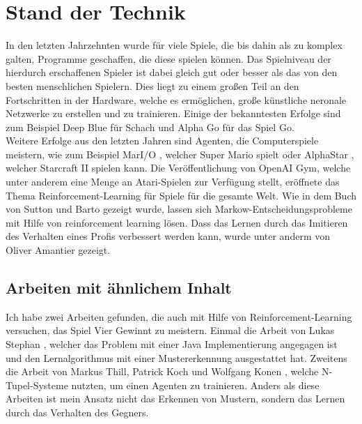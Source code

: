 \chapter{Stand der Technik}
\label{cha:Technik}

In den letzten Jahrzehnten wurde für viele Spiele, die bis dahin als zu komplex galten, Programme geschaffen, die diese spielen können. Das Spielniveau der hierdurch erschaffenen Spieler ist dabei gleich gut oder besser als das von den besten menschlichen Spielern.
Dies liegt zu einem großen Teil an den Fortschritten in der Hardware, welche es ermöglichen, große künstliche neronale Netzwerke zu erstellen und zu trainieren. Einige der bekanntesten Erfolge sind zum Beispiel Deep Blue für Schach und Alpha Go für das Spiel Go.\cite{Sutton2018}\\
Weitere Erfolge aus den letzten Jahren sind Agenten, die Computerspiele meistern, wie zum Beispiel MarI/O \cite{mario}, welcher Super Mario spielt oder AlphaStar \cite{alphastar}, welcher Starcraft II spielen kann.
Die Veröffentlichung von OpenAI Gym\cite{gym}, welche unter anderem eine Menge an Atari-Spielen zur Verfügung stellt, eröffnete das Thema Reinforcement-Learning für Spiele für die gesamte Welt. 
Wie in dem Buch von Sutton und Barto \cite{Sutton2018} gezeigt wurde, lassen sich Markow-Entscheidungsprobleme mit Hilfe von reinforcement learning lösen.   
Dass das Lernen durch das Imitieren des Verhalten eines Profis verbessert werden kann, wurde unter anderm von Oliver Amantier gezeigt. \cite{NIPS2016_6391,ARMANTIER2004221,price1999implicit}


\section{Arbeiten mit ähnlichem Inhalt}
Ich habe zwei Arbeiten gefunden, die auch mit Hilfe von Reinforcement-Learning versuchen, das Spiel Vier Gewinnt zu meistern. Einmal die Arbeit von Lukas Stephan \cite{Stephan2018}, welcher das Problem mit einer Java Implementierung angegagen ist und den Lernalgorithmus mit einer Mustererkennung ausgestattet hat. Zweitens die Arbeit von Markus Thill, Patrick Koch und Wolfgang Konen \cite{Thill2012}, welche N-Tupel-Systeme nutzten, um einen Agenten zu trainieren. Anders als diese Arbeiten ist mein Ansatz nicht das Erkennen von Mustern, sondern das Lernen durch das Verhalten des Gegners.









